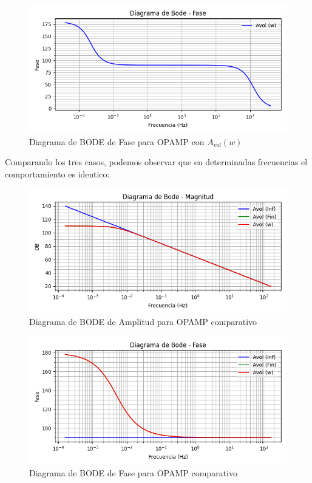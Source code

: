 \begin{figure}[H]
    \centering 
    \includegraphics [scale=1] {../Ejercicio3-CircuitoIntegradoresyDerivadores/Imagenes/diagrama-bode-noideal-fase.png} 
    \caption{Diagrama de BODE de Fase para OPAMP con $A_{vol}(w)$ }
    \label{fig:emptyPlotTool}
\end{figure}

Comparando los tres casos, podemos observar que en determinadas frecuencias el comportamiento es identico:

\begin{figure}[H]
    \centering 
    \includegraphics [scale=1] {../Ejercicio3-CircuitoIntegradoresyDerivadores/Imagenes/comparativo-magnitud.png} 
    \caption{Diagrama de BODE de Amplitud para OPAMP comparativo }
    \label{fig:emptyPlotTool}
\end{figure}

\begin{figure}[H]
    \centering 
    \includegraphics [scale=1] {../Ejercicio3-CircuitoIntegradoresyDerivadores/Imagenes/comparativo-fase.png} 
    \caption{Diagrama de BODE de Fase para OPAMP comparativo }
    \label{fig:emptyPlotTool}
\end{figure}

